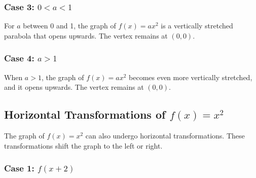 \subsubsection*{Case 3: \( 0 < a < 1 \)}

For \( a \) between 0 and 1, the graph of \( f(x) = ax^2 \) is a vertically stretched parabola that opens upwards. The vertex remains at \( (0, 0) \).

\begin{center}
\end{center}

\subsubsection*{Case 4: \( a > 1 \)}

When \( a > 1 \), the graph of \( f(x) = ax^2 \) becomes even more vertically stretched, and it opens upwards. The vertex remains at \( (0, 0) \).

\begin{center}
\end{center}

\subsection*{Horizontal Transformations of \( f(x) = x^2 \)}

The graph of \( f(x) = x^2 \) can also undergo horizontal transformations. These transformations shift the graph to the left or right.

\subsubsection*{Case 1: \( f(x+2) \)}

